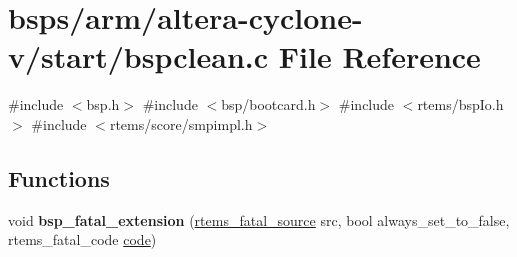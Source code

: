 \hypertarget{arm_2altera-cyclone-v_2start_2bspclean_8c}{}\section{bsps/arm/altera-\/cyclone-\/v/start/bspclean.c File Reference}
\label{arm_2altera-cyclone-v_2start_2bspclean_8c}
{\ttfamily \#include $<$bsp.\+h$>$}\newline
{\ttfamily \#include $<$bsp/bootcard.\+h$>$}\newline
{\ttfamily \#include $<$rtems/bsp\+Io.\+h$>$}\newline
{\ttfamily \#include $<$rtems/score/smpimpl.\+h$>$}\newline
\subsection*{Functions}
\begin{DoxyCompactItemize}
\item 
\mbox{\label{arm_2altera-cyclone-v_2start_2bspclean_8c_a016acec2532107839b8013fd3059d367}} 
void {\bfseries bsp\+\_\+fatal\+\_\+extension} (\mbox{\hyperlink{group__RTEMSScoreIntErr_ga878b4de77df7d0b83d19609d4de42c26}{rtems\+\_\+fatal\+\_\+source}} src, bool always\+\_\+set\+\_\+to\+\_\+false, rtems\+\_\+fatal\+\_\+code \mbox{\hyperlink{structcode}{code}})
\end{DoxyCompactItemize}
